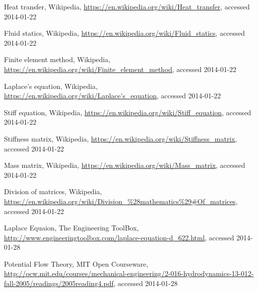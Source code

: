 \documentclass[a4paper,12pt]{article}
\begin{document}
\begin{thebibliography}{9}

  Heat transfer,
  Wikipedia,
  \url{https://en.wikipedia.org/wiki/Heat_transfer},
  accessed 2014-01-22

  Fluid statics,
  Wikipedia,
  \url{https://en.wikipedia.org/wiki/Fluid_statics},
  accessed 2014-01-22

  Finite element method,
  Wikipedia,
  \url{https://en.wikipedia.org/wiki/Finite_element_method},
  accessed 2014-01-22

  Laplace's equation,
  Wikipedia,
  \url{https://en.wikipedia.org/wiki/Laplace's_equation},
  accessed 2014-01-22

  Stiff equation,
  Wikipedia,
  \url{https://en.wikipedia.org/wiki/Stiff_equation},
  accessed 2014-01-22

  Stiffness matrix,
  Wikipedia,
  \url{https://en.wikipedia.org/wiki/Stiffness_matrix},
  accessed 2014-01-22

  Mass matrix,
  Wikipedia,
  \url{https://en.wikipedia.org/wiki/Mass_matrix},
  accessed 2014-01-22

  Division of matrices,
  Wikipedia,
  \url{https://en.wikipedia.org/wiki/Division_\%28mathematics\%29#Of_matrices},
  accessed 2014-01-22

  Laplace Equaion,
  The Engineering ToolBox,
  \url{http://www.engineeringtoolbox.com/laplace-equation-d_622.html},
  accessed 2014-01-28

  Potential Flow Theory,
  MIT Open Courseware,
  \url{http://ocw.mit.edu/courses/mechanical-engineering/2-016-hydrodynamics-13-012-fall-2005/readings/2005reading4.pdf},
  accessed 2014-01-28

\end{thebibliography}
\end{document}
